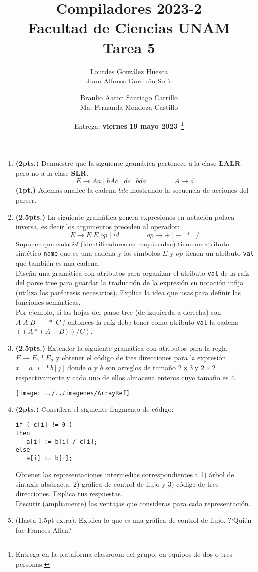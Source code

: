 \documentclass[11pt,letterpaper]{article}
\title{Compiladores 2023-2\\ Facultad de Ciencias UNAM \\ Tarea 5}
\author{Lourdes Gonz\'alez Huesca\\ Juan Alfonso Gardu\~no Sol\'is \and  
Braulio Aaron Santiago Carrillo  \\Ma. Fernanda Mendoza Castillo}
\date{Entrega: \textbf{viernes 19 mayo 2023}~\footnote{Entrega en la 
plataforma classroom del grupo, en equipos de dos o tres personas.}}
\begin{document}
\maketitle

\begin{enumerate}


\item \textbf{(2pts.)} Demuestre que la siguiente gram\'atica pertenece a la 
clase \textbf{LALR} pero no a la clase \textbf{SLR}.
\[
E \to Aa \mid bAc \mid dc \mid  bda \qquad \qquad A \to  d 
\]
\textbf{(1pt.)} Adem\'as analice la cadena $bdc$ mostrando la secuencia de
acciones del parser.


\item \textbf{(2.5pts.)} La siguiente gram\'atica genera expresiones en 
notaci\'on polaca inversa, es decir los argumentos preceden al operador:
\[
 E \to E\; E\; op \mid id \qquad \qquad op \to + \mid - \mid * \mid /
\]
Suponer que cada $id$ (identificadores en may\'usculas) tiene un atributo 
sint\'etico \texttt{name} que es una cadena y los s\'imbolos $E$ y $op$ tienen 
un atributo \texttt{val} que tambi\'en es una cadena.\\
Dise\~na una gram\'atica con atributos para organizar el atributo \texttt{val} 
de la ra\'iz del parse tree para guardar la traducci\'on de la expresi\'on en 
notaci\'on infija (utiliza los par\'entesis necesarios). 
Explica la idea que usas para definir las funciones sem\'anticas.\\
Por ejemplo, si las hojas del parse tree (de izquierda a derecha) son 
$A\; A\; B \; - \;* \; C \;/$ entonces la ra\'iz debe tener como atributo 
\texttt{val} la cadena $((A*(A-B))/C)$.
 

\item \textbf{(2.5pts.)} Extender la siguiente gram\'atica con atributos para 
la regla $E \to E_1 * E_2$ y obtener el c\'odigo de tres direcciones para la 
expresi\'on $x = a[i] * b[j] $ donde $a$ y $b$ son arreglos de tama\~no 
$2\times 3$ y $2\times 2$ respectivamente y cada uno de ellos almacena enteros 
cuyo tama\~no es $4$.
\begin{center}
\texttt{[image: ../../imagenes/ArrayRef]}
\end{center}


\item \textbf{(2pts.)} Considera el siguiente fragmento de c\'odigo:
\begin{lstlisting}
if ( c[i] != 0 )
then 
   a[i] := b[i] / c[i];
else 
   a[i] := b[i];
\end{lstlisting}
Obtener las representaciones intermedias correspondientes a 1) \'arbol de 
sintaxis abstracta; 2) gr\'afica de control de flujo y 3) c\'odigo de tres 
direcciones. Explica tus respuestas. \\
Discutir (ampliamente) las ventajas que consideras para cada representaci\'on.

\item (Hasta 1.5pt extra). Explica lo que es una gr\'afica de control de flujo.
?`Qui\'en fue Frances Allen? 

\end{enumerate}
\end{document}
